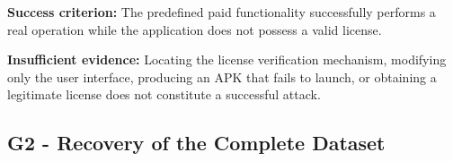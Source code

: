 \documentclass{article}
\begin{document}
\noindent
\textbf{Success criterion:}
The predefined paid functionality successfully performs
a real operation while the application does not possess
a valid license.

\medskip

\noindent
\textbf{Insufficient evidence:}
Locating the license verification mechanism,
modifying only the user interface,
producing an APK that fails to launch,
or obtaining a legitimate license does not
constitute a successful attack.

\newpage

\subsection{G2 - Recovery of the Complete Dataset}
\label{subsec:attack-tree-g2}
\end{document}
